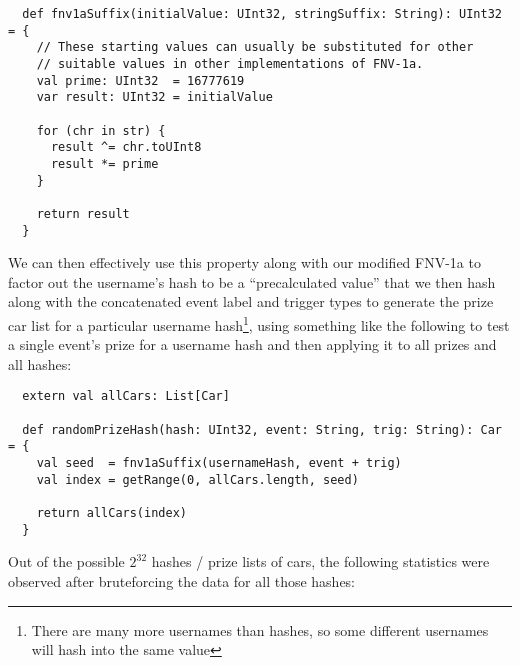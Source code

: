 \documentclass[14pt,a4paper,notitlepage]{extarticle}
\begin{document}
                \begin{lstlisting}
  def fnv1aSuffix(initialValue: UInt32, stringSuffix: String): UInt32 = {
    // These starting values can usually be substituted for other
    // suitable values in other implementations of FNV-1a.
    val prime: UInt32  = 16777619
    var result: UInt32 = initialValue

    for (chr in str) {
      result ^= chr.toUInt8
      result *= prime
    }

    return result
  }
                \end{lstlisting}

                We can then effectively use this property along with our modified FNV-1a to factor out
                the username's hash to be a ``precalculated value'' that we then hash along with the
                concatenated event label and trigger types to generate the prize car list for a
                particular username hash\footnote{There are many more usernames than hashes, so some
                different usernames will hash into the same value}, using something like the
                following to test a single event's prize for a username hash and then applying it to
                all prizes and all hashes:

            \begin{lstlisting}
  extern val allCars: List[Car]

  def randomPrizeHash(hash: UInt32, event: String, trig: String): Car = {
    val seed  = fnv1aSuffix(usernameHash, event + trig)
    val index = getRange(0, allCars.length, seed)

    return allCars(index)
  }
            \end{lstlisting}

                Out of the possible $2^{32}$ hashes / prize lists of cars, the following statistics
                were observed after bruteforcing the data for all those hashes:
\end{document}
